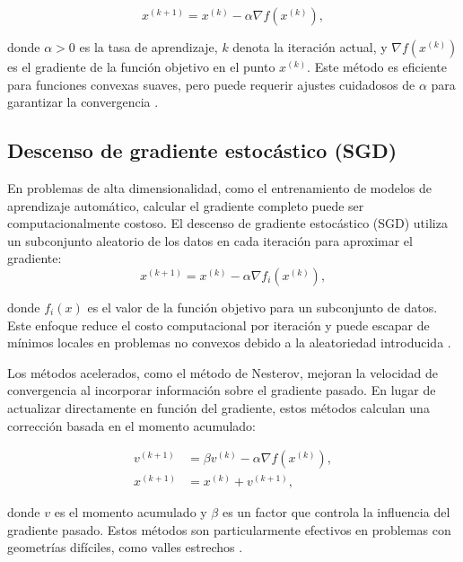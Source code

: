 \begin{itemize}
\begin{equation}
			x^{(k+1)} = x^{(k)} - \alpha \nabla f(x^{(k)}),
\end{equation}
		
		donde \(\alpha > 0\) es la tasa de aprendizaje, \(k\) denota la iteración actual, y \(\nabla f(x^{(k)})\) es el gradiente de la función objetivo en el punto \(x^{(k)}\). Este método es eficiente para funciones convexas suaves, pero puede requerir ajustes cuidadosos de \(\alpha\) para garantizar la convergencia \cite{boyd2004convex}.
		
\subsection{Descenso de gradiente estocástico (SGD)}
		
		En problemas de alta dimensionalidad, como el entrenamiento de modelos de aprendizaje automático, calcular el gradiente completo puede ser computacionalmente costoso. El descenso de gradiente estocástico (SGD) utiliza un subconjunto aleatorio de los datos en cada iteración para aproximar el gradiente:
\begin{equation}
			x^{(k+1)} = x^{(k)} - \alpha \nabla f_i(x^{(k)}),
\end{equation}
	
		donde \(f_i(x)\) es el valor de la función objetivo para un subconjunto de datos. Este enfoque reduce el costo computacional por iteración y puede escapar de mínimos locales en problemas no convexos debido a la aleatoriedad introducida \cite{goodfellow2016deep}.
		
		
		Los métodos acelerados, como el método de Nesterov, mejoran la velocidad de convergencia al incorporar información sobre el gradiente pasado. En lugar de actualizar directamente en función del gradiente, estos métodos calculan una corrección basada en el momento acumulado:
		
		\begin{align}
			v^{(k+1)} &= \beta v^{(k)} - \alpha \nabla f(x^{(k)}), \\
			x^{(k+1)} &= x^{(k)} + v^{(k+1)},
		\end{align}
		
		donde \(v\) es el momento acumulado y \(\beta\) es un factor que controla la influencia del gradiente pasado. Estos métodos son particularmente efectivos en problemas con geometrías difíciles, como valles estrechos \cite{nesterov1983method}.
		

\end{itemize}
